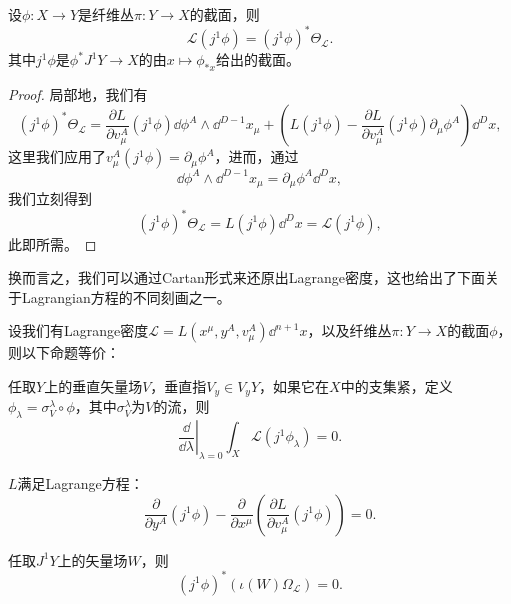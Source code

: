 \begin{pro}\label{pro:1.17}
    设$\phi:X\to Y$是纤维丛$\pi:Y\to X$的截面，则
    \[
        \mathcal L(j^1\phi)=(j^1\phi)^*\Theta_{\mathcal L}.
    \]
    其中$j^1\phi$是$\phi^*J^1Y\to X$的由$x\mapsto \phi_{*x}$给出的截面。
\end{pro}

\begin{proof}
    局部地，我们有
    \[
        (j^1\phi)^*\Theta_{\mathcal L}=\frac{\partial L}{\partial v^A_\mu}(j^1\phi)\dd \phi^A\wedge \dd^{D-1}x_\mu + \left(L(j^1\phi)-\frac{\partial L}{\partial v^A_\mu}(j^1\phi)\partial_\mu \phi^A\right)\dd^{D} x,
    \]
    这里我们应用了$v_\mu^A(j^1\phi)=\partial_\mu\phi^A$，进而，通过
    \[
        \dd \phi^A\wedge \dd^{D-1}x_\mu=\partial_\mu \phi^A\dd^{D} x,
    \]
    我们立刻得到
    \[
        (j^1\phi)^*\Theta_{\mathcal L}=L(j^1\phi)\dd^{D} x=\mathcal L(j^1\phi),
    \]
    此即所需。
\end{proof}

换而言之，我们可以通过Cartan形式来还原出Lagrange密度，这也给出了下面关于Lagrangian方程的不同刻画之一。

\begin{thm}\label{Lagrangeeq}
    设我们有Lagrange密度$\mathcal{L}=L\left(x^\mu,y^A,v^A_\mu\right)\dd^{n+1}x$，以及纤维丛$\pi:Y\to X$的截面$\phi$，则以下命题等价：
    \begin{compactenum}
        \item 任取$Y$上的垂直矢量场$V$，垂直指$V_y\in V_yY$，如果它在$X$中的支集紧，定义$\phi_\lambda=\sigma^\lambda_V\circ \phi$，其中$\sigma^\lambda_V$为$V$的流，则\[\left.\frac{\dd}{\dd \lambda}\right|_{\lambda=0}\int_X \mathcal L(j^1\phi_\lambda)=0.\]
        \item $L$满足Lagrange方程：
        \[
            \frac{\partial}{\partial y^A}(j^1\phi)-\frac{\partial}{\partial x^\mu}\left(\frac{\partial L}{\partial v^A_\mu}(j^1\phi)\right)=0.
        \]
        \item 任取$J^1Y$上的矢量场$W$，则 
        \[
            (j^1\phi)^*(\iota(W)\Omega_{\mathcal L})=0.
        \]
    \end{compactenum}
\end{thm}

